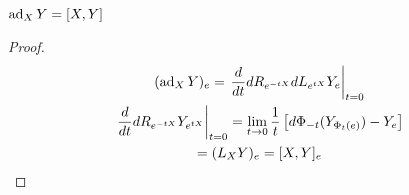 \begin{teorema}
    $\operatorname{ad}_XY=[X,Y]$
    \begin{proof}
        \begin{gather*}
        (\operatorname{ad}_XY)_e =\left. \frac{d}{dt}dR_{e^{-tX}}dL_{e^{tX}}Y_e\right|_{t=0}\\
        \left.\frac{d}{dt}dR_{e^{-tX}}Y_{e^{tX}}\right|_{t=0} = \lim_{t\to 0} \frac{1}{t} \left[d\Phi_{-t} (Y_{\Phi_t(e)})-Y_e\right]\\
        = (L_XY)_e = [X,Y]_e
        \end{gather*}
    \end{proof}
\end{teorema}
